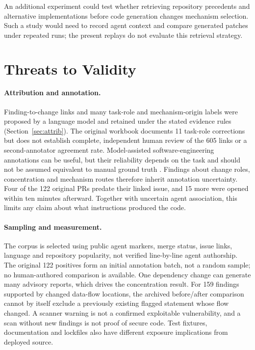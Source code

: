 \documentclass[acmsmall,screen,nonacm]{acmart}
\begin{document}
An additional experiment could test whether retrieving repository precedents and alternative implementations before code generation changes mechanism selection. Such a study would need to record agent context and compare generated patches under repeated runs; the present replays do not evaluate this retrieval strategy.

\section{Threats to Validity}\label{sec:threats}

\paragraph{Attribution and annotation.} Finding-to-change links and many task-role and mechanism-origin labels were proposed by a language model and retained under the stated evidence rules (Section~\ref{sec:attrib}). The original workbook documents 11 task-role corrections but does not establish complete, independent human review of the 605 links or a second-annotator agreement rate. Model-assisted software-engineering annotations can be useful, but their reliability depends on the task and should not be assumed equivalent to manual ground truth \cite{b40}. Findings about change roles, concentration and mechanism routes therefore inherit annotation uncertainty. Four of the 122 original PRs predate their linked issue, and 15 more were opened within ten minutes afterward. Together with uncertain agent association, this limits any claim about what instructions produced the code.

\paragraph{Sampling and measurement.} The corpus is selected using public agent markers, merge status, issue links, language and repository popularity, not verified line-by-line agent authorship. The original 122 positives form an initial annotation batch, not a random sample; no human-authored comparison is available. One dependency change can generate many advisory reports, which drives the concentration result. For 159 findings supported by changed data-flow locations, the archived before/after comparison cannot by itself exclude a previously existing flagged statement whose flow changed. A scanner warning is not a confirmed exploitable vulnerability, and a scan without new findings is not proof of secure code. Test fixtures, documentation and lockfiles also have different exposure implications from deployed source.
\end{document}
